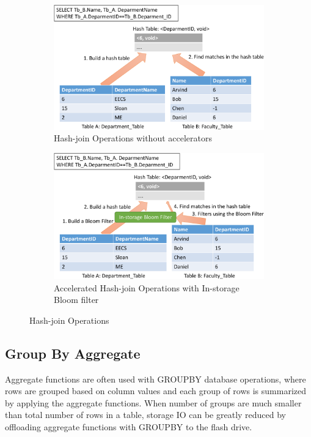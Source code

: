 \documentclass{article}
\begin{document}
\begin{figure}[!htb]
  \centering
  \begin{subfigure}[t]{0.48\textwidth}
    \includegraphics[width=\textwidth]{figures/hash-join-crop.pdf}
      \caption{Hash-join Operations without accelerators}
      \label{fig:hash-join}
  \end{subfigure}
  \begin{subfigure}[t]{0.48\textwidth}
    \includegraphics[width=\textwidth]{figures/filter-hash-join-crop.pdf}
    \caption{Accelerated Hash-join Operations with In-storage Bloom filter}
    \label{fig:filter-hash-join}
  \end{subfigure}
  \label{fig:try}
  \caption{Hash-join Operations}
\end{figure}

\subsection{Group By Aggregate}
Aggregate functions are often used with GROUPBY database operations, where rows are grouped based on column values and each group of rows is summarized by applying the aggregate functions.
When number of groups are much smaller than total number of rows in a table, storage IO can be greatly reduced by offloading aggregate functions with GROUPBY to the flash drive.
\end{document}
